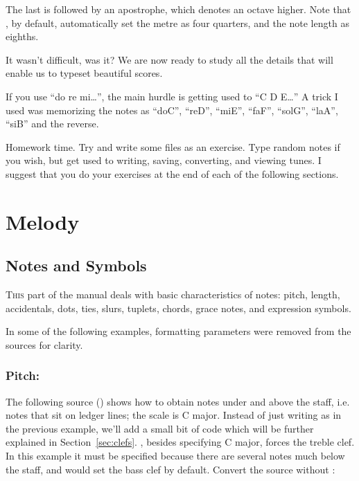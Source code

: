 \documentclass[a4paper,12pt]{book}
\begin{document}
The last  is followed by an apostrophe, which denotes an octave
higher. Note that \abcm{}, by default, automatically set the metre as
four quarters, and the note length as eighths.

It wasn't difficult, was it? We are now ready to study all the details
that will enable us to typeset beautiful scores.

\begin{note}

  If you use ``do re mi{\ldots}'', the main hurdle is getting used to
  ``C D E{\ldots}'' A trick I used was memorizing the notes as
  ``doC'', ``reD'', ``miE'', ``faF'', ``solG'', ``laA'', ``siB'' and
  the reverse.
  
\end{note}

Homework time. Try and write some \ABC{} files as an exercise. Type
random notes if you wish, but get used to writing, saving, converting,
and viewing tunes. I suggest that you do your exercises at the end of
each of the following sections.

\noteseparator


\chapter{Melody}

\section{Notes and Symbols}
\label{sec:note}

\lettrine{T}{his} part of the manual deals with basic characteristics
of notes: pitch, length, accidentals, dots, ties, slurs, tuplets,
chords, grace notes, and expression symbols.

\begin{note}

  In some of the following examples, formatting parameters were
  removed from the sources for clarity.

\end{note}


\subsection{Pitch: }
\label{sec:pitch}

The following source () shows how to obtain notes
under and above the staff, i.e. notes that sit on ledger lines; the
scale is C major. Instead of just writing  as in the
previous example, we'll add a small bit of code which will be further
explained in Section~\ref{sec:clefs}. , besides
specifying C major, forces the treble clef. In this example it must be
specified because there are several notes much below the staff, and
\abcm{} would set the bass clef by default. Convert the source without
:
\end{document}
